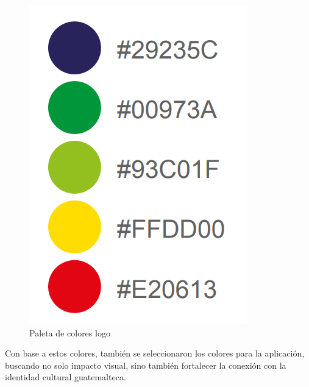 \begin{figure} [H]
    \centering
    \includegraphics[width=0.25\linewidth]{figuras/paleta_colores_logo.png}
    \caption{Paleta de colores logo}
    \label{fig:enter-label}
\end{figure}


Con base a estos colores, también se seleccionaron los colores para la aplicación, buscando no solo impacto visual, sino también  fortalecer la conexión con la identidad cultural guatemalteca.

